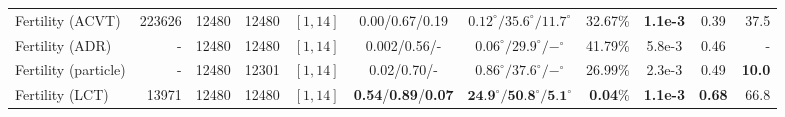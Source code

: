 \begin{table}[t]
{\begin{tabular}{lrrrcccrccr}
\midrule
Fertility (ACVT) & 223626     & 12480   & 12480   & $[1, 14]$   & 0.00/0.67/0.19      & $0.12^\circ/35.6^\circ/11.7^\circ$   & 32.67\%            & \textbf{1.1e-3}        & 0.39 %
      & 37.5             \\
Fertility (ADR) & -     & 12480   & 12480   & $[1, 14]$   & 0.002/0.56/-      & $0.06^\circ/29.9^\circ/-^\circ$   & 41.79\%            & 5.8e-3       & 0.46 %
    & - \\
Fertility (particle) &-   & 12480     & 12301  & $[1, 14]$    & 0.02/0.70/-      & $0.86^\circ/37.6^\circ/-^\circ$   & 26.99\%            & 2.3e-3          & 0.49 %
 & \textbf{10.0}           \\
Fertility (LCT)     & 13971   & 12480     & 12480  & $[1, 14]$   & \textbf{0.54}/\textbf{0.89}/\textbf{0.07}
& $\textbf{24.9}^\circ/\textbf{50.8}^\circ/\textbf{5.1}^\circ$   & \textbf{0.04}\%           & \textbf{1.1e-3}      & \textbf{0.68} %
& 66.8         \\
\midrule


\end{tabular}}
\end{table}
